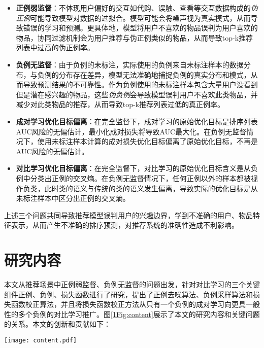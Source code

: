 \begin{itemize}
\item \textbf{正例弱监督}：不体现用户偏好的交互如代购、误触、查看等交互数据构成的\textit{伪正例}可能导致模型对数据的过拟合。模型可能会将噪声视为真实模式，从而导致错误的学习和预测。更具体地，模型将用户不喜欢的物品误判为用户喜欢的物品，协同过滤机制会为用户推荐与伪正例类似的物品，从而导致top-k推荐列表中过高的伪正例率。

\item \textbf{负例无监督}：由于负例的未标注，实际使用的负例来自未标注样本的数据分布，与负例的分布存在差异，模型无法准确地捕捉负例的真实分布和模式，从而导致预测结果的不可靠性。作为负例使用的未标注样本包含大量用户没看到但是潜在感兴趣的物品，这些\textit{伪负例}会导致模型误判用户不喜欢此类物品，并减少对此类物品的推荐，从而导致top-k推荐列表过低的真正例率。

\item \textbf{成对学习优化目标偏离}：在完全监督下，成对学习的原始优化目标是排序列表AUC风险的无偏估计，最小化成对损失将导致AUC最大化。在负例无监督情况下，使用未标注样本计算的成对损失优化目标偏离了原始优化目标，不再是AUC风险的无偏估计。

\item \textbf{对比学习优化目标偏离}：在完全监督下，对比学习的原始优化目标含义是从负例中分类出正例的交叉熵。在负例无监督情况下，任何正例以外的样本都被视作负类，此时类的语义与传统的类的语义发生偏离，导致实际的优化目标是从未标注样本中区分出正例的交叉熵。
\end{itemize}

上述三个问题共同导致推荐模型误判用户的兴趣边界，学到不准确的用户、物品特征表示，从而产生不准确的排序预测，对推荐系统的准确性造成不利影响。

\section{研究内容}
本文从推荐场景中正例弱监督、负例无监督的问题出发，针对对比学习的三个关键组件正例、负例、损失函数进行了研究，提出了正例去噪算法、负例采样算法和损失函数校正算法，并且将损失函数校正方法从只有一个负例的成对学习向更具一般性的多个负例的对比学习推广。图\ref{1Fig:content}展示了本文的研究内容和关键问题的关系。本文的创新和贡献如下：
\begin{figure*}[!]
	\centering
	\texttt{[image: content.pdf]}
	\caption{关键问题与研究内容的关系}
	\label{1Fig:content}
\end{figure*}

